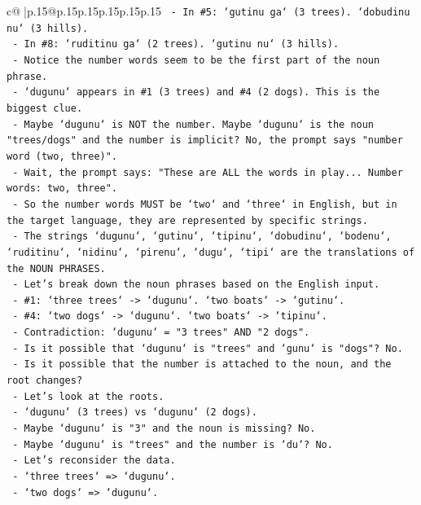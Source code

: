 \documentclass{article}
\begin{document}
{\begin{supertabular}{c@{$\;$}|p{.15\linewidth}@{}p{.15\linewidth}p{.15\linewidth}p{.15\linewidth}p{.15\linewidth}p{.15\linewidth}}
{{{\texttt{   {-} In \#5: `gutinu ga` (3 trees). `dobudinu nu` (3 hills).} \\
\texttt{   {-} In \#8: `ruditinu ga` (2 trees). `gutinu nu` (3 hills).} \\
\texttt{   {-} Notice the number words seem to be the first part of the noun phrase.} \\
\texttt{   {-} `dugunu` appears in \#1 (3 trees) and \#4 (2 dogs). This is the biggest clue.} \\
\texttt{   {-} Maybe `dugunu` is NOT the number. Maybe `dugunu` is the noun "trees/dogs" and the number is implicit? No, the prompt says "number word (two, three)".} \\
\texttt{   {-} Wait, the prompt says: "These are ALL the words in play... Number words: two, three".} \\
\texttt{   {-} So the number words MUST be `two` and `three` in English, but in the target language, they are represented by specific strings.} \\
\texttt{   {-} The strings `dugunu`, `gutinu`, `tipinu`, `dobudinu`, `bodenu`, `ruditinu`, `nidinu`, `pirenu`, `dugu`, `tipi` are the translations of the NOUN PHRASES.} \\
\texttt{   {-} Let's break down the noun phrases based on the English input.} \\
\texttt{   {-} \#1: `three trees` {-}> `dugunu`. `two boats` {-}> `gutinu`.} \\
\texttt{   {-} \#4: `two dogs` {-}> `dugunu`. `two boats` {-}> `tipinu`.} \\
\texttt{   {-} Contradiction: `dugunu` = "3 trees" AND "2 dogs".} \\
\texttt{   {-} Is it possible that `dugunu` is "trees" and `gunu` is "dogs"? No.} \\
\texttt{   {-} Is it possible that the number is attached to the noun, and the root changes?} \\
\texttt{   {-} Let's look at the roots.} \\
\texttt{   {-} `dugunu` (3 trees) vs `dugunu` (2 dogs).} \\
\texttt{   {-} Maybe `dugunu` is "3" and the noun is missing? No.} \\
\texttt{   {-} Maybe `dugunu` is "trees" and the number is `du`? No.} \\
\texttt{   {-} Let's reconsider the data.} \\
\texttt{   {-} `three trees` => `dugunu`.} \\
\texttt{   {-} `two dogs` => `dugunu`.} \\
}}}
\end{supertabular}}
\end{document}
